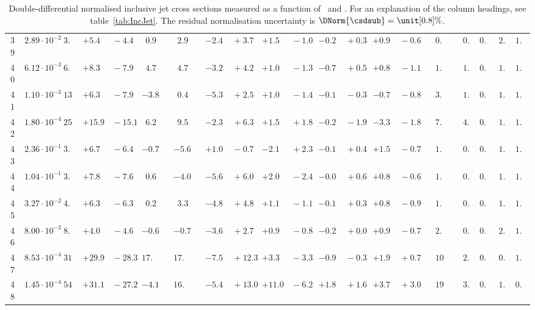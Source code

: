 \documentclass[12pt]{article}
\begin{document}
\begin{table}
\begin{tabular}{ccrr@{\hskip0pt}rrc@{\hskip0pt}r@{\hskip0pt}c@{\hskip0pt}r@{\hskip0pt}rr@{\hskip0pt}rr@{\hskip0pt}rr@{\hskip0pt}rr@{\hskip0pt}r@{\hskip0pt}r@{\hskip0pt}c|rr|r}
39 &$2.89 \cdot 10^{-2}$ &$ 3.2$  & ${+5.4~}$&${~-4.4}$ & $ 0.9$  & &$ 2.9$&&${-2.4~}$&${~+3.7}$ & ${+1.5~}$&${~-1.0}$ & ${-0.2~}$&${~+0.3}$ & ${+0.9~}$&${~-0.6}$ & &$ 0.8$&&$ 0.3$  & $0.96$  & $ 2.1$  & $1.01$   \\ 
40 &$6.12 \cdot 10^{-3}$ &$ 6.3$  & ${+8.3~}$&${~-7.9}$ & $ 4.7$  & &$ 4.7$&&${-3.2~}$&${~+4.2}$ & ${+1.0~}$&${~-1.3}$ & ${-0.7~}$&${~+0.5}$ & ${+0.8~}$&${~-1.1}$ & &$ 1.4$&&$ 1.5$  & $0.96$  & $ 1.8$  & $1.03$   \\ 
41 &$1.10 \cdot 10^{-3}$ &$13.7$  & ${+6.3~}$&${~-7.9}$ & $-3.8$  & &$ 0.4$&&${-5.3~}$&${~+2.5}$ & ${+1.0~}$&${~-1.4}$ & ${-0.1~}$&${~-0.3}$ & ${-0.7~}$&${~-0.8}$ & &$ 3.7$&&$ 1.5$  & $0.96$  & $ 1.3$  & $1.02$   \\ 
42 &$1.80 \cdot 10^{-4}$ &$25.0$  & ${+15.9~}$&${~-15.1}$ & $ 6.2$  & &$ 9.5$&&${-2.3~}$&${~+6.3}$ & ${+1.5~}$&${~+1.8}$ & ${-0.2~}$&${~-1.9}$ & ${-3.3~}$&${~-1.8}$ & &$ 7.7$&&$ 4.2$  & $0.95$  & $ 1.2$  & $1.03$   \\ 
43 &$2.36 \cdot 10^{-1}$ &$ 3.9$  & ${+6.7~}$&${~-6.4}$ & $-0.7$  & &$-5.6$&&${+1.0~}$&${~-0.7}$ & ${-2.1~}$&${~+2.3}$ & ${-0.1~}$&${~+0.4}$ & ${+1.5~}$&${~-0.7}$ & &$ 1.5$&&$ 0.6$  & $0.89$  & $ 1.3$  & $1.03$   \\ 
44 &$1.04 \cdot 10^{-1}$ &$ 3.7$  & ${+7.8~}$&${~-7.6}$ & $ 0.6$  & &$-4.0$&&${-5.6~}$&${~+6.0}$ & ${+2.0~}$&${~-2.4}$ & ${-0.0~}$&${~+0.6}$ & ${+0.8~}$&${~-0.6}$ & &$ 1.3$&&$ 0.4$  & $0.95$  & $ 1.2$  & $1.02$   \\ 
45 &$3.27 \cdot 10^{-2}$ &$ 4.9$  & ${+6.3~}$&${~-6.3}$ & $ 0.2$  & &$ 3.3$&&${-4.8~}$&${~+4.8}$ & ${+1.1~}$&${~-1.1}$ & ${-0.1~}$&${~+0.3}$ & ${+0.8~}$&${~-0.9}$ & &$ 1.3$&&$ 0.4$  & $0.96$  & $ 1.8$  & $1.00$   \\ 
46 &$8.00 \cdot 10^{-3}$ &$ 8.5$  & ${+4.0~}$&${~-4.6}$ & $-0.6$  & &$-0.7$&&${-3.6~}$&${~+2.7}$ & ${+0.9~}$&${~-0.8}$ & ${-0.2~}$&${~+0.0}$ & ${+0.9~}$&${~-0.7}$ & &$ 2.0$&&$ 0.7$  & $0.96$  & $ 2.0$  & $1.01$   \\ 
47 &$8.53 \cdot 10^{-4}$ &$31.3$  & ${+29.9~}$&${~-28.3}$ & $17.4$  & &$17.5$&&${-7.5~}$&${~+12.3}$ & ${+3.3~}$&${~-3.3}$ & ${-0.9~}$&${~-0.3}$ & ${+1.9~}$&${~+0.7}$ & &$10.6$&&$ 2.8$  & $0.96$  & $ 0.9$  & $1.03$   \\ 
48 &$1.45 \cdot 10^{-4}$ &$54.7$  & ${+31.1~}$&${~-27.2}$ & $-4.1$  & &$16.1$&&${-5.4~}$&${~+13.0}$ & ${+11.0~}$&${~-6.2}$ & ${+1.8~}$&${~+1.6}$ & ${+3.7~}$&${~+3.0}$ & &$19.2$&&$ 3.5$  & $0.95$  & $ 1.8$  & $0.99$   \\ 
\hline
\hline
\end{tabular}

    \caption{
      Double-differential normalised inclusive jet cross sections measured as a function of \Qsq\ and \ptjet. 
      For an explanation of the column headings, see table~\ref{tab:IncJet}.
      The residual normalisation uncertainty is $\DNorm{\csdsub} =\unit[0.8]{\%}$.
  }
  \label{tab:NormIncJet}
\end{table}
\end{document}

